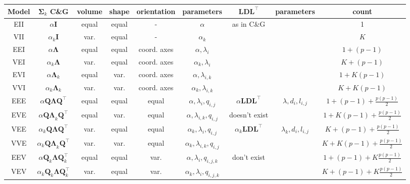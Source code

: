 \begin{table}[!htb]
    \centering
    {
        \begin{tabular}{| c | c c c c c | c c c |}
            \hline
            Model & $\pmb{\Sigma}_k$ C\&G & volume & shape & orientation & parameters & $ \pmb{LDL}^\top $ & parameters & count \\
            \hline

            EII    & $ \alpha \pmb{I} $ & equal & equal & - & $ \alpha $ & as in C\&G & & 1 \\
            VII    & $ \alpha_k \pmb{I} $         & var. & equal & - & $ \alpha_k $ & & & $K$  \\
            EEI    & $ \alpha \pmb{\Lambda} $     & equal & equal & coord. axes & $ \alpha, \lambda_i $ & & & $ 1+(p-1) $\\
            VEI    & $ \alpha_k \pmb{\Lambda} $ & var. & equal & coord. axes & $ \alpha_k, \lambda_{i}$ & & & $ K+(p-1) $ \\
            EVI    & $ \alpha \pmb{\Lambda}_k $ &equal & var. & coord. axes & $ \alpha, \lambda_{i,k} $ & & & $ 1+K(p-1) $ \\
            VVI    & $ \alpha_k \pmb{\Lambda}_k $ & var. & var. & coord. axes & $ \alpha_k, \lambda_{i,k} $ & & & $ K+K(p-1) $ \\
            \hline
            EEE    & $ \alpha \pmb{Q \Lambda Q}^\top $ &equal & equal & equal & $ \alpha, \lambda_{i}, q_{i,j} $ & $ \alpha \pmb{LDL}^{\top} $ & $ \lambda , d_i, l_{i,j} $ & $ 1+(p-1)+\frac{p(p-1)}{2} $ \\
            \hline
            EVE    & $ \alpha \pmb{Q \Lambda}_k \pmb{Q}^\top $ &equal & var. & equal & $ \alpha, \lambda_{i,k}, q_{i,j} $  & doesn't exist & & $ 1+K(p-1)+\frac{p(p-1)}{2} $ \\
            \hline
            VEE    & $ \alpha_k \pmb{Q \Lambda Q}^\top $ & var. & equal & equal & $ \alpha_k, \lambda_{i}, q_{i,j} $ & $ \alpha_k \pmb{LDL}^\top $ & $ \lambda_k , d_i, l_{i,j} $ & $ K+(p-1)+\frac{p(p-1)}{2} $ \\
            \hline
            VVE    & $ \alpha_k \pmb{Q \Lambda}_k \pmb{Q}^\top $ &var. & var. & equal & $ \alpha_k, \lambda_{i,k}, q_{i,j} $ & & & $ K+K(p-1)+\frac{p(p-1)}{2} $ \\
            EEV    & $ \alpha \pmb{Q}_k \pmb{\Lambda} \pmb{Q}_k^\top $ &equal & equal & var. & $ \alpha, \lambda_{i}, q_{i,j,k} $ &  don't exist  & & $ 1+(p-1)+K\frac{p(p-1)}{2} $ \\
            VEV    & $ \alpha_k \pmb{Q}_k \pmb{\Lambda} \pmb{Q}_k^\top $ &var. & equal & var. & $ \alpha_k, \lambda_{i}, q_{i,j,k} $ & & & $ K+(p-1)+K\frac{p(p-1)}{2} $ \\

\end{tabular}}
\end{table}
